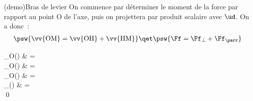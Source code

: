 \documentclass[../../main/main.tex]{subfiles}
\begin{document}
\begin{tcb*}(demo){Bras de levier}
	On commence par déterminer le moment de la force par rapport au point O de
	l'axe, puis on projettera par produit scalaire avec $\ud$. On a donc~:
	\begin{gather*}
		\psw{
			\vv{\rm OM} = \vv{\rm OH} + \vv{\rm HM}
		}
		\qet
		\psw{
			\Ff = \Ff_{\perp} + \Ff_{\parr}
		}
	\end{gather*}
	\begin{DispWithArrows*}
		\Mcf_{\rm O}(\Ff)
		& =
		\Arrow{$\Ff = \Ff_{\perp} + \Ff_{\parr}$}
		\\\Lra
		\Mcf_{\rm O}(\Ff)
		& =
		\psw{
			\OM \wedge (\Ff_{\parr} + \Ff_{\perp})
		}
		\\\Lra
		\Mcf_{\rm O}(\Ff)
		& =
		\psw{
			\underbracket[1pt]{\OM \wedge \Ff_{\parr}}_{\perp \ud} +
			\underbracket[1pt]{\OM \wedge \Ff_{\perp}}_{\parr \ud}
		}
		\CArrow{$\cdot \ud$}
		\\\Ra
		\Mc_{\D}(\Ff)
		& =
		\\\Lra
		\qed
	\end{DispWithArrows*}
\end{tcb*}
\end{document}
